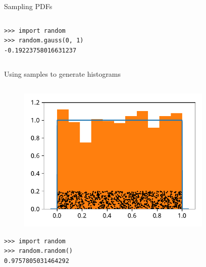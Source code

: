 \documentclass[12pt, aspectratio=149]{beamer}
\theoremstyle{plain}
\begin{document}
\begin{frame}[fragile]{Sampling PDFs}
\begin{columns}
\begin{column}{0.5\textwidth}
\begin{center}
\begin{figure}
		 \end{figure}
		  \begin{verbatim}
>>> import random
>>> random.gauss(0, 1)
-0.19223758016631237
		  \end{verbatim}
		 \end{center}
	\end{column}
	\end{columns}
\end{frame}
	
\begin{frame}[fragile]{Using samples to generate histograms}
\begin{columns}
\begin{column}{0.5\textwidth}
	\begin{center}
 \begin{figure}
	 \centering
	 \includegraphics[width=0.99\linewidth]{figures/uniform_samples_hist}
 \end{figure}
 \begin{verbatim}
>>> import random
>>> random.random()
0.9757805031464292
 \end{verbatim}
 \end{center}
\end{column}
\begin{column}{0.5\textwidth}  %
	\begin{center}
 \begin{figure}
	 \centering

\end{figure}
\end{center}
\end{column}
\end{columns}
\end{frame}
\end{document}
